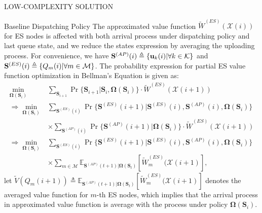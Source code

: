 \documentclass[10pt, conference, letterpaper]{IEEEtran}
\newcommand{\define}{\triangleq}
\newcommand{\leadto}{\Rightarrow}
\renewcommand{\vec}{\mathbf}
\DeclarePairedDelimiter{\set}{\{}{\}}
\newcommand{\apSet}{\mathcal{K}}
\newcommand{\esSet}{\mathcal{M}}
\newcommand{\Stat}{\mathbf{S}}
\newcommand{\Obsv}{\mathcal{X}}
\newcommand{\Policy}{\mathbf{\Omega}}
\begin{document}
\begin{section}{LOW-COMPLEXITY SOLUTION}
\begin{subsection}{Baseline Dispatching Policy}
            The approximated value function $\tilde{W}^{(ES)}(\Obsv(i))$ for ES nodes is affected with both arrival process under dispatching policy and last queue state, and we reduce the states expression by averaging the uploading process. For convenience, we have $\Stat^{(AP)}(i) \define \set{\vec{u}_k(i)|\forall k\in\apSet}$ and $\Stat^{(ES)}(i) \define \set{Q_m(i)|\forall m\in\esSet}$.
            The probability expression for partial ES value function optimization in Bellman's Equation is given as:
            \begin{align}
                \min_{\Policy(\Stat_i)}& \sum_{\Stat_{i+1}} \Pr\{\Stat_{i+1}|\Stat_{i}, \Policy(\Stat_i)\} \cdot \tilde{W}^{(ES)}(\Obsv(i+1))
                \nonumber\\
                \leadto \min_{\Policy(\Stat_i)}& \sum_{\Stat^{(ES)}(i)} \Pr\{\Stat^{(ES)}(i+1)|\Stat^{(ES)}(i),\Stat^{(AP)}(i), \Policy(\Stat_i)\}
                    \nonumber\\
                    & \times \sum_{\Stat^{(AP)}(i)} \Pr\{\Stat^{(AP)}(i+1)|\Policy(\Stat_i)\} \cdot \tilde{W}^{(ES)}(\Obsv(i+1))
                \nonumber\\
                \leadto \min_{\Policy(\Stat_i)}& \sum_{\Stat^{(ES)}(i)} \Pr\{\Stat^{(ES)}(i+1)|\Stat^{(ES)}(i),\Stat^{(AP)}(i), \Policy(\Stat_i)\}
                    \nonumber\\
                    & \times \sum_{m\in\esSet} \mathbb{E}_{\Stat^{(AP)}(t+1)|\Policy(\Stat_t)}[\tilde{W}^{(ES)}_m(\Obsv(i+1)],
            \end{align}
            let $\tilde{V}(Q_m(i+1)) \define \mathbb{E}_{\Stat^{(AP)}(t+1)|\Policy(\Stat_t)}[\tilde{W}^{(ES)}_m(\Obsv(i+1)]$ denotes the averaged value function for $m$-th ES nodes, which implies that the arrival process in approximated value function is average with the process under policy $\Policy(\Stat_i)$.


\end{subsection}
\end{section}
\end{document}
